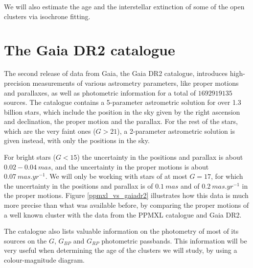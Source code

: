 \documentclass[twocolumn]{revtex4}
\begin{document}
We will also estimate the age and the interstellar extinction of some of the open clusters via isochrone fitting.

\section{The Gaia DR2 catalogue}
The second release of data from Gaia, the Gaia DR2 catalogue\cite{gaiadr2}, introduces high-precision measurements of various astrometry parameters, like proper motions and parallaxes, as well as photometric information for a total of $1 692 919 135$ sources. The catalogue contains a 5-parameter astrometric solution for over 1.3 billion stars, which include the position in the sky given by the right ascension and declination, the proper motion and the parallax. For the rest of the stars, which are the very faint ones ($G > 21$), a 2-parameter astrometric solution is given instead, with only the positions in the sky.

For bright stars ($G < 15$) the uncertainty in the positions and parallax is about $0.02-0.04\ \si{mas}$, and the uncertainty in the proper motions is about $0.07\ \si{mas.yr^{-1}}$. We will only be working with stars of at most $G = 17$, for which the uncertainty in the positions and parallax is of $0.1\ \si{mas}$ and of $0.2\ \si{mas.yr^{-1}}$ in the proper motions. Figure \ref{ppmxl_vs_gaiadr2} illustrates how this data is much more precise than what was available before, by comparing the proper motions of a well known cluster with the data from the PPMXL catalogue and Gaia DR2.

The catalogue also lists valuable information on the photometry of most of its sources on the $G$, $G_{BP}$ and $G_{RP}$ photometric passbands. This information will be very useful when determining the age of the clusters we will study, by using a colour-magnitude diagram.
\end{document}

